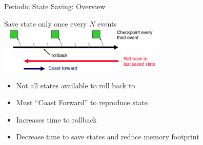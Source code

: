 \documentclass[10pt]{beamer}
\begin{document}
\begin{frame}{Periodic State Saving: Overview}
    \begin{block}{Save state only once every $N$ events}
        \bigskip
        \centering
        \includegraphics[width=0.6\textwidth]{../figs/pss.png}
        \bigskip
        \begin{itemize}
            \item Not all states available to roll back to
            \item Must ``Coast Forward'' to reproduce state
            \item Increases time to rollback
            \item Decrease time to save states and reduce memory footprint
        \end{itemize}
    \end{block}
\end{frame}
\end{document}
